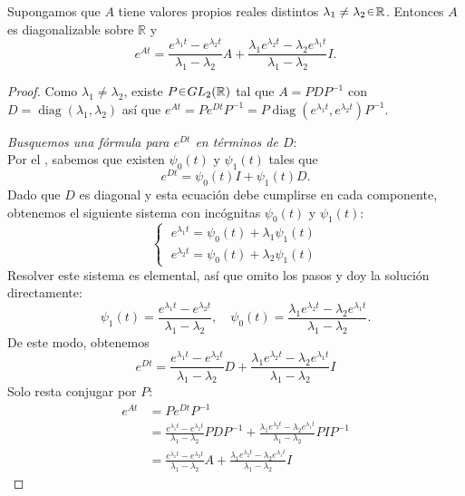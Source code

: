 \begin{teo}\label{teo:distinct}
Supongamos que $A$ tiene valores propios reales distintos $\lambda_1 \neq \lambda_2 \en \mathbb{R}$. Entonces $A$ es diagonalizable sobre $\mathbb{R}$ y
\[
e^{At} = \frac{e^{\lambda_1 t} - e^{\lambda_2 t}}{\lambda_1 - \lambda_2} A + \frac{\lambda_1 e^{\lambda_2 t} - \lambda_2 e^{\lambda_1 t}}{\lambda_1 - \lambda_2} I.
\]
\end{teo}

\begin{proof}
Como $\lambda_1 \neq \lambda_2$, existe $P \en GL_2(\mathbb{R})$ tal que 
\(
A = P D P^{-1}\) con \( D = \operatorname{diag}(\lambda_1,\lambda_2)
\)
así que $e^{At} = P e^{Dt} P^{-1} = P \operatorname{diag}(e^{\lambda_1t}, e^{\lambda_2t}) P^{-1}$.\par\vspace{1em}

\emph{Busquemos una fórmula para $e^{Dt}$ en términos de $D$}:\\
Por el , sabemos que existen $\psi_0(t)$ y $\psi_1(t)$ tales que
\[
e^{Dt} = \psi_0(t) I + \psi_1(t) D.
\]
Dado que $D$ es diagonal y esta ecuación debe cumplirse en cada componente, obtenemos el siguiente sistema con incógnitas $\psi_0(t)$ y $\psi_1(t)$:
\[
\begin{cases}
\;e^{\lambda_1 t} = \psi_0(t) + \lambda_1 \psi_1(t) \\
\;e^{\lambda_2 t} = \psi_0(t) + \lambda_2 \psi_1(t)
\end{cases}
\]
Resolver este sistema es elemental, así que omito los pasos y doy la solución directamente:
\[
\psi_1(t) = \frac{e^{\lambda_1 t} - e^{\lambda_2 t}}{\lambda_1 - \lambda_2}, \quad 
\psi_0(t) = \frac{\lambda_1 e^{\lambda_2 t} - \lambda_2 e^{\lambda_1 t}}{\lambda_1 - \lambda_2}.
\]
De este modo, obtenemos 
\[
e^{Dt} = \frac{e^{\lambda_1 t} - e^{\lambda_2 t}}{\lambda_1 - \lambda_2} D + \frac{\lambda_1 e^{\lambda_2 t} - \lambda_2 e^{\lambda_1 t}}{\lambda_1 - \lambda_2} I
\]
Solo resta conjugar por $P$:
\begin{align*}
e^{At}%
&= P e^{Dt} P^{-1}\\
&= \frac{e^{\lambda_1 t} - e^{\lambda_2 t}}{\lambda_1 - \lambda_2} PDP^{-1} + \frac{\lambda_1 e^{\lambda_2 t} - \lambda_2 e^{\lambda_1 t}}{\lambda_1 - \lambda_2} PIP^{-1}\\
&= \frac{e^{\lambda_1 t} - e^{\lambda_2 t}}{\lambda_1 - \lambda_2} A + \frac{\lambda_1 e^{\lambda_2 t} - \lambda_2 e^{\lambda_1 t}}{\lambda_1 - \lambda_2} I
\end{align*}
\end{proof}

